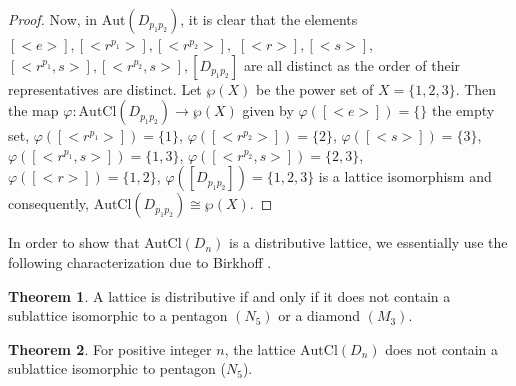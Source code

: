\documentclass{article}
\theoremstyle{definition}
\newtheorem{theorem}{Theorem}[section]
\begin{document}
\begin{proof}
Now, in $\text{Aut}(D_{p_1p_2})$, it is clear that the elements $[\bigl<e\bigr>],[\bigl<r^{p_1}\bigr>],[\bigl<r^{p_2}\bigr>],$  $ [\bigl<r\bigr>],[\bigl<s\bigr>],$ $[\bigl<r^{p_1},s\bigr>],[\bigl<r^{p_2},s\bigr>],[D_{p_1p_2}]$ are all distinct as the order of their representatives are distinct. Let $\wp(X)$ be the power set of $X=\{1,2,3\}$. Then the map $\varphi:\text{AutCl}(D_{p_1p_2})\to \wp(X)$ given by $\varphi([\bigl<e\bigr>])=\{\}$ the empty set, $\varphi([\bigl<r^{p_1}\bigr>])=\{1\}$, $\varphi([\bigl<r^{p_2}\bigr>])=\{2\}$, $\varphi([\bigl<s\bigr>])=\{3\}$, $\varphi([\bigl<r^{p_1},s\bigr>])=\{1,3\}$, $\varphi([\bigl<r^{p_2},s\bigr>])=\{2,3\}$, $\varphi([\bigl<r\bigr>])=\{1,2\}$, $\varphi([D_{p_1p_2}])=\{1,2,3\}$ is a lattice isomorphism and consequently, $\text{AutCl}(D_{p_1p_2})\cong \wp(X)$. \end{proof}
In order to show that AutCl$(D_n)$ is a distributive lattice, we essentially use the following characterization due to Birkhoff \cite{Schmidt+1994}. 
\begin{theorem}
     \cite{Schmidt+1994} A lattice is distributive if and only if it does not contain a sublattice isomorphic to a pentagon $(N_5)$ or a diamond $(M_3)$. \end{theorem}
\begin{theorem}
 For positive integer $n$, the lattice $\text{AutCl}(D_n)$ does not contain a sublattice isomorphic to pentagon ($N_5$). \end{theorem}
\end{document}
